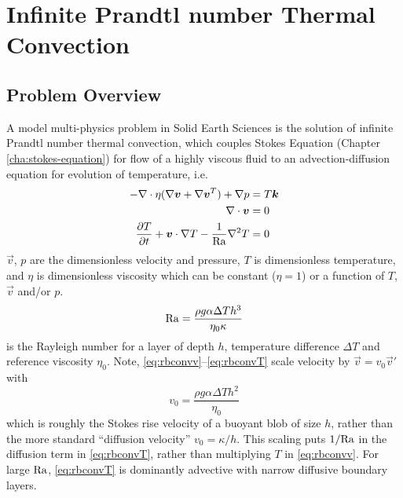 \chapter{Infinite Prandtl number Thermal Convection}
\label{cha:thermal-convection}

\section{Problem Overview}
\label{sec:convection_problem-formulation}

A model multi-physics  problem in Solid Earth Sciences is the solution of
infinite Prandtl number thermal convection, which couples Stokes
Equation (Chapter \ref{cha:stokes-equation}) for flow of a highly
viscous fluid to an advection-diffusion
equation for evolution of temperature, i.e.
\begin{align}
-\nabla\cdot\eta(\nabla{\mbox{\boldmath$v$}} + \nabla{\mbox{\boldmath$v$}}^{T}) + \nabla p & = T{\mbox{\boldmath$k$}} \label{eq:rbconvv}\\ 
\nabla\cdot {\mbox{\boldmath$v$}} &= 0  \label{eq:rbconvp}\\
  \frac{\partial T}{\partial t} + {\mbox{\boldmath$v$}}\cdot\nabla T - \frac{1}{\mathrm{Ra}}\nabla^2 T &= 0 \label{eq:rbconvT}
\end{align}
$\vec{v}$, $p$ are the dimensionless velocity and pressure, $T$ is
dimensionless temperature, and $\eta$ is dimensionless viscosity which
can be constant ($\eta=1$) or a function of $T$, $\vec{v}$ and/or $p$.
\begin{displaymath}
  \mathrm{Ra} = \frac{\rho g \alpha \Delta T h^{3}}{\eta_{0}\kappa}
\end{displaymath}
is the Rayleigh number for a layer of depth $h$, temperature
difference $\Delta T$ and reference viscosity $\eta_{0}$. 
Note, \eqref{eq:rbconvv}--\eqref{eq:rbconvT} scale velocity by
$\vec{v}=v_0\vec{v}'$ with
\begin{equation}
  \label{eq:4.6}
  v_0 = \frac{\rho g\alpha\Delta T h^{2}}{\eta_0}
\end{equation}
which is roughly the Stokes rise velocity of a buoyant blob of size $h$, rather than the
more standard ``diffusion velocity'' $v_0=\kappa/h$. This
scaling puts $1/\mathrm{Ra}$ in the diffusion term in \eqref{eq:rbconvT}, rather
than multiplying $T$ in \eqref{eq:rbconvv}. For large $\mathrm{Ra}$, \eqref{eq:rbconvT}
is dominantly advective with narrow diffusive boundary layers. 

